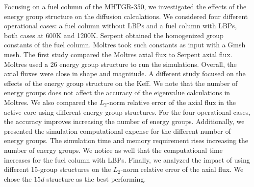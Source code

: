 \documentclass[11pt,letterpaper]{article}
\begin{document}
Focusing on a fuel column of the MHTGR-350, we investigated the effects of the energy group structure on the diffusion calculations.
We considered four different operational cases: a fuel column without LBPs and a fuel column with LBPs, both cases at 600K and 1200K.
Serpent obtained the homogenized group constants of the fuel column.
Moltres took such constants as input with a Gmsh mesh.
The first study compared the Moltres axial flux to Serpent axial flux.
Moltres used a 26 energy group structure to run the simulations.
Overall, the axial fluxes were close in shape and magnitude.
A different study focused on the effects of the energy group structure on the \gls{Keff}.
We note that the number of energy groups does not affect the accuracy of the eigenvalue calculations in Moltres.
We also compared the $L_2$-norm relative error of the axial flux in the active core using different energy group structures.
For the four operational cases, the accuracy improves increasing the number of energy groups.
Additionally, we presented the simulation computational expense for the different number of energy groups.
The simulation time and memory requirement rises increasing the number of energy groups.
We notice as well that the computational time increases for the fuel column with LBPs.
Finally, we analyzed the impact of using different 15-group structures on the $L_2$-norm relative error of the axial flux.
We chose the $15d$ structure as the best performing.





\pagebreak


\end{document}
